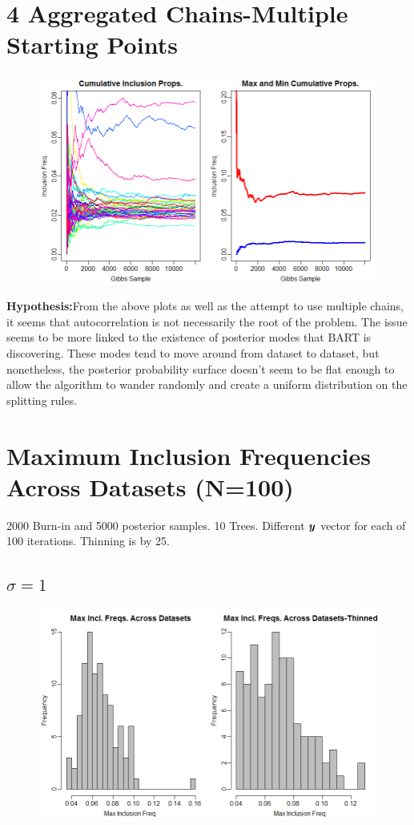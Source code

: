 \documentclass[12pt]{article}
\begin{document}
\section{4 Aggregated Chains-Multiple Starting Points}
\begin{figure}[H]
\centerline{\includegraphics[scale=.52]{mult_chain_sq1_n250}}
\end{figure}

\textbf{Hypothesis:}From the above plots as well as the attempt to use multiple chains, it seems that autocorrelation is not necessarily the root of the problem. The issue seems to be more linked to the existence of posterior modes that BART is discovering. These modes tend to move around from dataset to dataset, but nonetheless, the posterior probability surface doesn't seem to be flat enough to allow the algorithm to wander randomly and create a uniform distribution on the splitting rules. 
\newpage
\section{Maximum Inclusion Frequencies Across Datasets (N=100)}
2000 Burn-in and 5000 posterior samples. 10 Trees. Different $\boldsymbol{y}$ vector for each of 100 iterations. Thinning is by 25. 
\subsection*{$\sigma=1$}
\begin{figure}[H]
\centerline{\includegraphics[scale=.47]{maxs_sq1}}
\end{figure}
\end{document}
